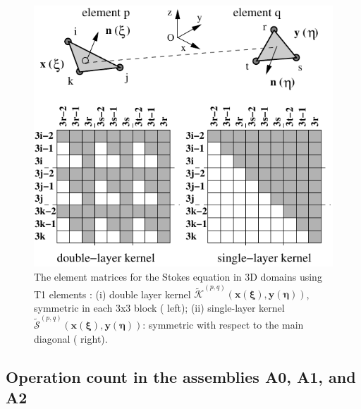 \documentclass[oneside,onecolumn,10pt,final]{asme2ej}
\newcounter{tema}
\begin{document}
\begin{figure}[tb]
 {%
  \centerline{%
  \includegraphics[width=8.6truecm]{./FIG/elemental-simetria-1}
  }%
}{}%
 {%
  \centerline{%
  }%
}{}%
%
\caption{%
  The element matrices for the Stokes equation in 3D domains
  using T1 elements : (i) double layer kernel 
  ${\tilde{\mathcal{K}}}^{(p,q)}(\bm{x}(\bm{\xi}),\bm{y}(\bm{\eta}))$, %
  symmetric in each 3x3 block ( left); (ii) %
  single-layer kernel 
  ${\tilde{\mathcal{S}}}^{(p,q)}(\bm{x}(\bm{\xi}),\bm{y}(\bm{\eta}))$: %
  symmetric with respect to the main diagonal ( right).}%
\label{fg-elemental-simetria}
\end{figure}

\subsection{Operation count in the assemblies A0, A1, and A2}
\label{subsubsec:number-operations}
\end{document}
